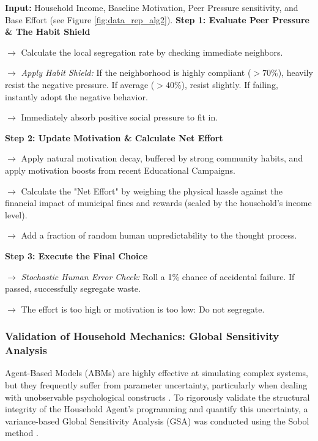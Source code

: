 \begin{algorithm}[H]
\caption{The Household's Daily Decision Process (To Segregate or Not?)}
\label{alg:household_decision_english}
\begin{algorithmic}[1]
\State \textbf{Input:} Household Income, Baseline Motivation, Peer Pressure sensitivity, and Base Effort (see Figure \ref{fig:data_rep_alg2}).
\Statex
\State \textbf{Step 1: Evaluate Peer Pressure \& The Habit Shield}
\State \parbox[t]{0.9\linewidth}{$\rightarrow$ Calculate the local segregation rate by checking immediate neighbors.\strut}
    \State \parbox[t]{0.88\linewidth}{$\rightarrow$ \textit{Apply Habit Shield:} If the neighborhood is highly compliant ($>70\%$), heavily resist the negative pressure. If average ($>40\%$), resist slightly. If failing, instantly adopt the negative behavior.\strut}
\Else
    \State \parbox[t]{0.88\linewidth}{$\rightarrow$ Immediately absorb positive social pressure to fit in.\strut}
\EndIf
\Statex
\State \textbf{Step 2: Update Motivation \& Calculate Net Effort}
\State \parbox[t]{0.9\linewidth}{$\rightarrow$ Apply natural motivation decay, buffered by strong community habits, and apply motivation boosts from recent Educational Campaigns.\strut}
\State \parbox[t]{0.9\linewidth}{$\rightarrow$ Calculate the "Net Effort" by weighing the physical hassle against the financial impact of municipal fines and rewards (scaled by the household's income level).\strut}
\State \parbox[t]{0.9\linewidth}{$\rightarrow$ Add a fraction of random human unpredictability to the thought process.\strut}
\Statex
\State \textbf{Step 3: Execute the Final Choice}
    \State \parbox[t]{0.88\linewidth}{$\rightarrow$ \textit{Stochastic Human Error Check:} Roll a 1\% chance of accidental failure. If passed, successfully segregate waste.\strut}
\Else
    \State \parbox[t]{0.88\linewidth}{$\rightarrow$ The effort is too high or motivation is too low: Do not segregate.\strut}
\EndIf
\end{algorithmic}
\end{algorithm}


\subsubsection{Validation of Household Mechanics: Global Sensitivity Analysis}

Agent-Based Models (ABMs) are highly effective at simulating complex systems, but they frequently suffer from parameter uncertainty, particularly when dealing with unobservable psychological constructs \citep{McCulloch2022}. To rigorously validate the structural integrity of the Household Agent's programming and quantify this uncertainty, a variance-based Global Sensitivity Analysis (GSA) was conducted using the Sobol method \citep{Sobol2001}. 

